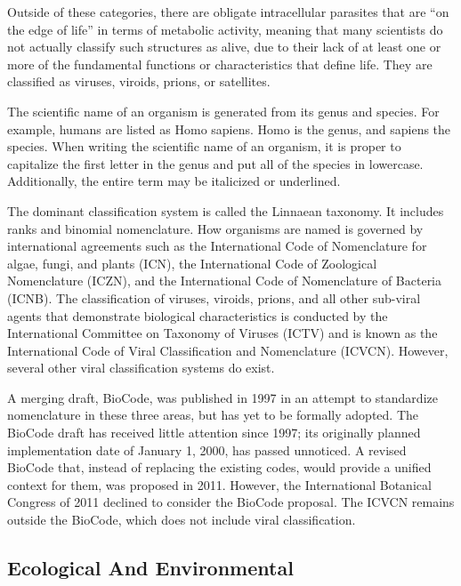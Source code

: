 \documentclass[
]{book}
\begin{document}
Outside of these categories, there are obligate intracellular parasites that are ``on the edge of life'' in terms of metabolic activity, meaning that many scientists do not actually classify such structures as alive, due to their lack of at least one or more of the fundamental functions or characteristics that define life. They are classified as viruses, viroids, prions, or satellites.

The scientific name of an organism is generated from its genus and species. For example, humans are listed as Homo sapiens. Homo is the genus, and sapiens the species. When writing the scientific name of an organism, it is proper to capitalize the first letter in the genus and put all of the species in lowercase. Additionally, the entire term may be italicized or underlined.

The dominant classification system is called the Linnaean taxonomy. It includes ranks and binomial nomenclature. How organisms are named is governed by international agreements such as the International Code of Nomenclature for algae, fungi, and plants (ICN), the International Code of Zoological Nomenclature (ICZN), and the International Code of Nomenclature of Bacteria (ICNB). The classification of viruses, viroids, prions, and all other sub-viral agents that demonstrate biological characteristics is conducted by the International Committee on Taxonomy of Viruses (ICTV) and is known as the International Code of Viral Classification and Nomenclature (ICVCN). However, several other viral classification systems do exist.

A merging draft, BioCode, was published in 1997 in an attempt to standardize nomenclature in these three areas, but has yet to be formally adopted. The BioCode draft has received little attention since 1997; its originally planned implementation date of January 1, 2000, has passed unnoticed. A revised BioCode that, instead of replacing the existing codes, would provide a unified context for them, was proposed in 2011. However, the International Botanical Congress of 2011 declined to consider the BioCode proposal. The ICVCN remains outside the BioCode, which does not include viral classification.

\hypertarget{ecological-and-environmental}{%
\subsection{Ecological And Environmental}\label{ecological-and-environmental}}
\end{document}
